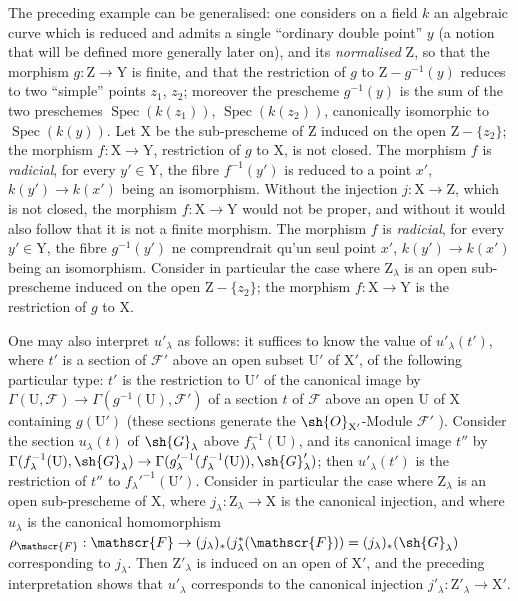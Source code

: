 \begin{env}[11.7.3]
\label{IV.11.7.3}
The preceding example can be generalised: one considers on a field $k$ an algebraic curve which is reduced and admits a single ``ordinary double point'' $y$ (a notion that will be defined more generally later on), and its \emph{normalised} $\mathrm{Z}$, so that the morphism $g:\mathrm{Z}\to\mathrm{Y}$ is finite, and that the restriction of $g$ to $\mathrm{Z}-g^{-1}(y)$ reduces to two ``simple'' points $z_1$, $z_2$; moreover the prescheme $g^{-1}(y)$ is the sum of the two preschemes $\operatorname{Spec}(k(z_1))$, $\operatorname{Spec}(k(z_2))$, canonically isomorphic to $\operatorname{Spec}(k(y))$.
Let $\mathrm{X}$ be the sub-prescheme of $\mathrm{Z}$ induced on the open $\mathrm{Z}-\{z_2\}$; the morphism $f:\mathrm{X}\to\mathrm{Y}$, restriction of $g$ to $\mathrm{X}$, is not closed.
The morphism $f$ is \emph{radicial}, for every $y'\in\mathrm{Y}$, the fibre $f^{-1}(y')$ is reduced to a point $x'$, $k(y')\to k(x')$ being an isomorphism.
Without the injection $j:\mathrm{X}\to\mathrm{Z}$, which is not closed, the morphism $f:\mathrm{X}\to\mathrm{Y}$ would not be proper, and without  it would also follow that it is not a finite morphism.
The morphism $f$ is \emph{radicial}, for every $y'\in\mathrm{Y}$, the fibre $g^{-1}(y')$ ne comprendrait qu'un seul point $x'$, $k(y')\to k(x')$ being an isomorphism.
Consider in particular the case where $\mathrm{Z}_\lambda$ is an open sub-prescheme induced on the open $\mathrm{Z}-\{z_2\}$; the morphism $f:\mathrm{X}\to\mathrm{Y}$ is the restriction of $g$ to $\mathrm{X}$.

One may also interpret $u'_\lambda$ as follows: it suffices to know the value of $u'_\lambda(t')$, where $t'$ is a section of $\mathscr{F}'$ above an open subset $\mathrm{U}'$ of $\mathrm{X}'$, of the following particular type: $t'$ is the restriction to $\mathrm{U}'$ of the canonical image by $\Gamma(\mathrm{U},\mathscr{F})\to\Gamma(g^{-1}(\mathrm{U}),\mathscr{F}')$ of a section $t$ of $\mathscr{F}$ above an open $\mathrm{U}$ of $\mathrm{X}$ containing $g(\mathrm{U}')$ (these sections generate the $\sh{O}_{\mathrm{X}'}$-Module $\mathscr{F}'$ ).
Consider the section $u_\lambda(t)$ of $\sh{G}_\lambda$ above $f_\lambda^{-1}(\mathrm{U})$, and its canonical image $t''$ by $\Gamma(f_\lambda^{-1}(\mathrm{U}),\sh{G}_\lambda)\to\Gamma(g_\lambda'^{-1}(f_\lambda^{-1}(\mathrm{U})),\sh{G}'_\lambda)$; then $u'_\lambda(t')$ is the restriction of $t''$ to $f_\lambda'^{-1}(\mathrm{U}')$.
Consider in particular the case where $\mathrm{Z}_\lambda$ is an open sub-prescheme of $\mathrm{X}$, where $j_\lambda:\mathrm{Z}_\lambda\to\mathrm{X}$ is the canonical injection, and where $u_\lambda$ is the canonical homomorphism $\rho_\mathscr{F}:\mathscr{F}\to(j_\lambda)_*(j_\lambda^*(\mathscr{F}))=(j_\lambda)_*(\sh{G}_\lambda)$  corresponding to $j_\lambda$.
Then $\mathrm{Z}'_\lambda$ is induced on an open of $\mathrm{X}'$, and the preceding interpretation shows that $u'_\lambda$ corresponds to the canonical injection $j'_\lambda:\mathrm{Z}'_\lambda\to\mathrm{X}'$.
\end{env}

